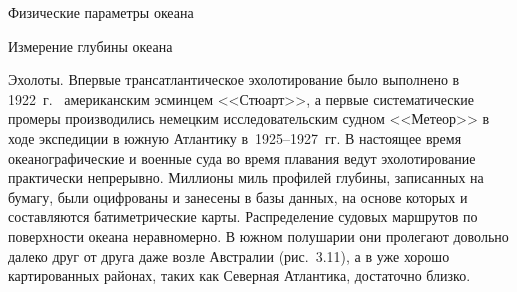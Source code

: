 \begin{chapter}{Физические параметры океана}
\begin{section}{Измерение глубины океана}
\begin{paragraph}{Эхолоты.}
Впервые трансатлантическое эхолотирование было выполнено в 1922~г.\ %
американским эсминцем <<Стюарт>>, 
а первые систематические промеры производились немецким
исследовательским судном <<Метеор>> в ходе экспедиции в южную
Атлантику в~1925--1927~гг. В настоящее время океанографические и военные суда
во время плавания ведут эхолотирование практически непрерывно.
Миллионы миль профилей глубины, записанных на бумагу,
были оцифрованы и занесены в базы данных, на основе которых и
составляются батиметрические карты. Распределение судовых маршрутов по
поверхности океана неравномерно. В южном полушарии они пролегают
довольно далеко друг от друга даже возле Австралии (рис.~3.11), 
а в уже хорошо картированных районах, таких как Северная Атлантика, 
достаточно близко.
%


\end{paragraph}
\end{section}
\end{chapter}
